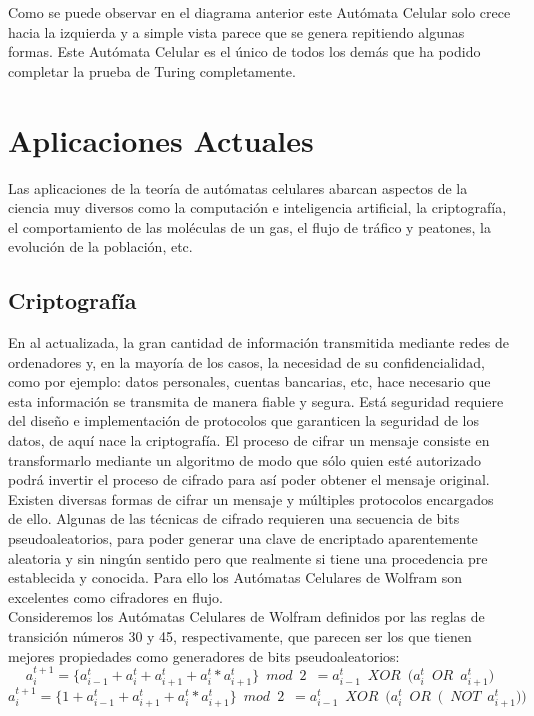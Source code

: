 Como se puede observar en el diagrama anterior este Autómata Celular solo crece hacia la izquierda y a simple vista parece que se genera repitiendo algunas formas. Este Autómata Celular es el único de todos los demás que ha podido completar la prueba de Turing completamente.


\section{Aplicaciones Actuales} %
Las aplicaciones de la teoría de autómatas celulares abarcan aspectos de la ciencia muy diversos como la computación e inteligencia artificial, la criptografía, el comportamiento de las moléculas de un gas, el flujo de tráfico y peatones, la evolución de la población, etc.

\subsection{Criptografía}
En al actualizada, la gran cantidad de información transmitida mediante redes de ordenadores y, en la mayoría de los casos, la necesidad de su confidencialidad, como por ejemplo: datos personales, cuentas bancarias, etc, hace necesario que esta información se transmita de manera fiable y segura. Está seguridad requiere del diseño e implementación de protocolos que garanticen la seguridad de los datos, de aquí nace la criptografía. El proceso de cifrar un mensaje consiste en transformarlo mediante un algoritmo de modo que sólo quien esté autorizado podrá invertir el proceso de cifrado para así poder obtener el mensaje original. Existen diversas formas de cifrar un mensaje y múltiples protocolos encargados de ello. Algunas de las técnicas de cifrado requieren una secuencia de bits pseudoaleatorios, para poder generar una clave de encriptado aparentemente aleatoria y sin ningún sentido pero que realmente si tiene una procedencia pre establecida y conocida. Para ello los Autómatas Celulares de Wolfram son excelentes como cifradores en flujo.\\

Consideremos los Autómatas Celulares de Wolfram definidos por las reglas de transición números 30 y 45, respectivamente, que parecen ser los que tienen mejores propiedades como generadores de bits pseudoaleatorios:
$$a_i^{t+1}  =  \lbrace a_{i-1}^t + a_i^t + a_{i+1}^t + a_i^t * a_{i+1}^t \rbrace \enspace  mod\enspace 2\enspace = a_{i-1}^t  \enspace XOR \enspace \big( a_i^t \enspace OR \enspace a_{i+1}^t \big) $$ 
$$a_i^{t+1}  =  \lbrace 1 + a_{i-1}^t + a_{i+1}^t + a_i^t * a_{i+1}^t \rbrace \enspace  mod\enspace 2\enspace = a_{i-1}^t  \enspace XOR \enspace \big( a_i^t \enspace OR \enspace \big( \enspace NOT \enspace a_{i+1}^t \big)\big) $$ 

